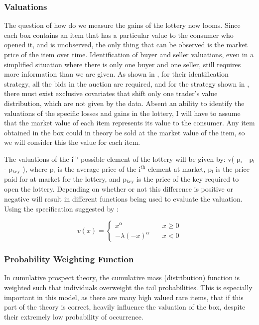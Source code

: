 \documentclass[12pt, letterpaper]{paper}
\begin{document}
\subsubsection{Valuations}
\label{sec-2-3-1}
The question of how do we measure the gains of the lottery now
looms. Since each box contains an item that has a particular value to
the consumer who opened it, and is unobserved, the only thing that can
be observed is the market price of the item over time. Identification
of buyer and seller valuations, even in a simplified situation where
there is only one buyer and one seller, still requires more
information than we are given. As shown in \cite{NonParIdent}, for their
identification strategy, all the bids in the auction are required, and
for the strategy shown in \cite{PriceDataOnly}, there must exist
exclusive covariates that shift only one trader's value distribution,
which are not given by the data. Absent an ability to identify the
valuations of the specific losses and gains in the lottery, I will
have to assume that the market value of each item represents its value
to the consumer. Any item obtained in the box could in theory be
sold at the market value of the item, so we will consider this the
value for each item. 

The valuations of the i$^{\text{th}}$ possible element of the lottery will be
given by: v( p$_{\text{i}}$ - p$_{\text{l}}$ - p$_{\text{key}}$ ), where p$_{\text{i}}$ is the average price of the
i$^{\text{th}}$ element at market, p$_{\text{l}}$ is the price paid for at market for the
lottery, and p$_{\text{key}}$ is the price of the key required to open the
lottery. Depending on whether or not this difference is positive or
negative will result in different functions being used to evaluate the
valuation. Using the specification suggested by \cite{Kahn}:

\begin{equation}
\label{piecewiseValuation}
v(x) = \begin{cases} x^\alpha \quad &x \geq 0\\ -\lambda(-x)^\alpha \quad &x < 0 \end{cases}
\end{equation}

\subsubsection{Probability Weighting Function}
\label{sec-2-3-2}

In cumulative prospect theory, the cumulative mass (distribution)
function is weighted such that individuals overweight the tail
probabilities. This is especially important in this model, as there are
many high valued rare items, that if this part of the theory is
correct, heavily influence the valuation of the box, despite their
extremely low probability of occurrence.
\end{document}
